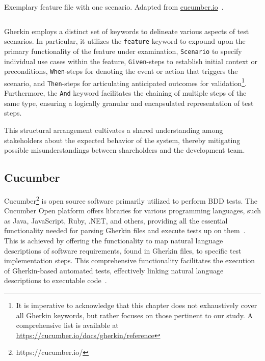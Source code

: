 \begin{listing}[!ht]
\caption{Exemplary feature file with one scenario. Adapted from 
\href{https://cucumber.io/blog/bdd/getting-started-with-bdd-part-1/}{cucumber.io}~\cite{noauthor_getting_nodate}.}
\label{lst:withdrawcash}
\inputminted[linenos, xleftmargin=2em]{gherkin}{files/code/atm.feature}
\end{listing}

Gherkin employs a distinct set of keywords to delineate various aspects of test scenarios. In particular, it utilizes the \texttt{feature} keyword to expound upon the primary functionality of the feature under examination, \texttt{Scenario} to specify individual use cases within the feature, \texttt{Given}-steps to establish initial context or preconditions, \texttt{When}-steps for denoting the event or action that triggers the scenario, and \texttt{Then}-steps for articulating anticipated outcomes for validation\footnote{It is imperative to acknowledge that this chapter does not exhaustively cover all Gherkin keywords, but rather focuses on those pertinent to our study. A comprehensive list is available at \href{https://cucumber.io/docs/gherkin/reference/\#keywords}{https://cucumber.io/docs/gherkin/reference}}. Furthermore, the \texttt{And} keyword facilitates the chaining of multiple steps of the same type, ensuring a logically granular and encapsulated representation of test steps. 

This structural arrangement cultivates a shared understanding among stakeholders about the expected behavior of the system, thereby mitigating possible misunderstandings between shareholders and the development team.

\subsection{Cucumber}
\label{subsec:cucumber}
Cucumber\footnote{https://cucumber.io/} is open source software primarily utilized to perform \ac{BDD} tests. The Cucumber Open platform offers libraries for various programming languages, such as Java, JavaScript, Ruby, .NET, and others, providing all the essential functionality needed for parsing Gherkin files and execute tests up on them~\cite{noauthor_cucumber_nodate}. This is achieved by offering the functionality to map natural language descriptions of software requirements, found in Gherkin files, to specific test implementation steps. This comprehensive functionality facilitates the execution of Gherkin-based automated tests, effectively linking natural language descriptions to executable code~\cite{wynne2012cucumber}.

